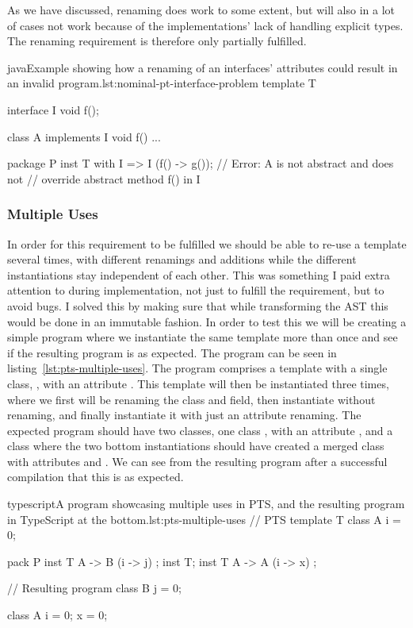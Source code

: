 As we have discussed, renaming does work to some extent, but will also in a lot of cases not work because of the implementations' lack of handling explicit types.
The renaming requirement is therefore only partially fulfilled.

\begin{code}{java}{Example showing how a renaming of an interfaces' attributes could result in an invalid program.}{lst:nominal-pt-interface-problem}
    template T {
        interface I {
            void f();
        }

        class A implements I {
            void f() { ... }
        }
    }

    package P {
        inst T with I => I (f() -> g());
        // Error: A is not abstract and does not
        // override abstract method f() in I
    }
\end{code}

\subsubsection{Multiple Uses}\label{subsubsec:pts-multiple-uses}

In order for this requirement to be fulfilled we should be able to re-use a template several times, with different renamings and additions while the different instantiations stay independent of each other.
This was something I paid extra attention to during implementation, not just to fulfill the requirement, but to avoid bugs.
I solved this by making sure that while transforming the AST this would be done in an immutable fashion.
In order to test this we will be creating a simple program where we instantiate the same template more than once and see if the resulting program is as expected.
The program can be seen in listing~\vref{lst:pts-multiple-uses}.
The program comprises a template  with a single class, , with an attribute .
This template will then be instantiated three times, where we first will be renaming the class and field, then instantiate without renaming, and finally instantiate it with just an attribute renaming.
The expected program should have two classes, one class , with an attribute , and a class  where the two bottom instantiations should have created a merged class with attributes  and .
We can see from the resulting program after a successful compilation that this is as expected.

\begin{code}{typescript}{A program showcasing multiple uses in PTS, and the resulting program in TypeScript at the bottom.}{lst:pts-multiple-uses}
    // PTS
    template T {
        class A {
            i = 0;
        }
    }

    pack P {
        inst T { A -> B (i -> j) };
        inst T;
        inst T { A -> A (i -> x) };
    }

    // Resulting program
    class B {
        j = 0;
    }

    class A {
        i = 0;
        x = 0;
    }
\end{code}

